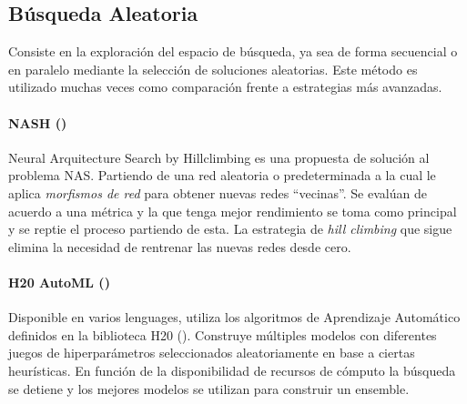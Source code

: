 \subsection{B\'usqueda Aleatoria}
Consiste en la exploraci\'on del espacio de b\'usqueda, ya sea de forma secuencial o en paralelo mediante la selecci\'on de soluciones aleatorias. Este m\'etodo es utilizado muchas veces como comparaci\'on frente a estrategias m\'as avanzadas.

\paragraph{NASH (\cite{wei2016network})} Neural Arquitecture Search by Hillclimbing es una propuesta de soluci\'on al problema NAS.
Partiendo de una red aleatoria o predeterminada a la cual le aplica \textit{morfismos de red} para obtener  nuevas redes ``vecinas''. Se eval\'uan de acuerdo a una  m\'etrica y la que tenga mejor rendimiento se toma como principal y se reptie el proceso partiendo de esta. La estrategia de \textit{hill climbing} que sigue elimina la necesidad de rentrenar las nuevas redes desde cero.

        \paragraph{H20 AutoML (\cite{ledell2020h2o})} Disponible en varios lenguages, utiliza los algoritmos de Aprendizaje Autom\'atico definidos en la biblioteca H20 (\cite{boehmke2019hands}). Construye m\'ultiples modelos con diferentes juegos de hiperpar\'ametros seleccionados aleatoriamente en base a ciertas heur\'isticas. En funci\'on de la disponibilidad de recursos de c\'omputo la b\'usqueda se detiene y los mejores modelos se utilizan para construir un ensemble.

